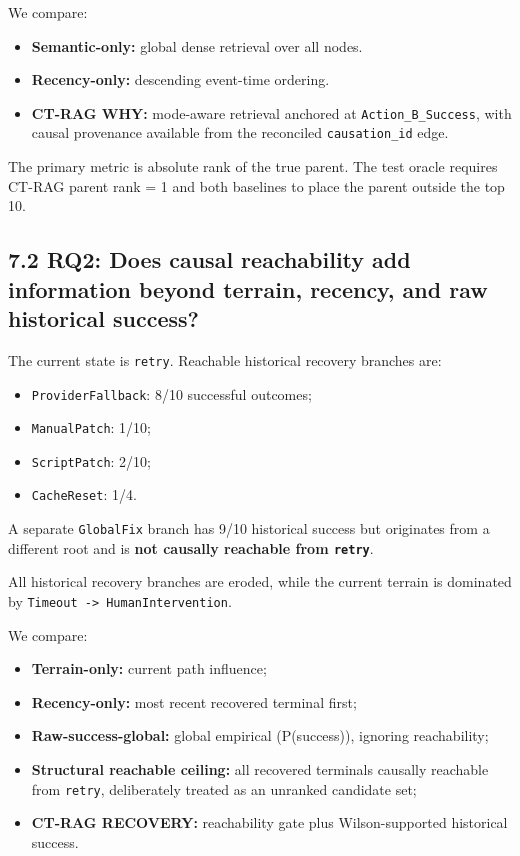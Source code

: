 \documentclass[
  11pt,
]{article}
\providecommand{\tightlist}{%
  \setlength{\itemsep}{0pt}\setlength{\parskip}{0pt}}
\begin{document}
We compare:

\begin{itemize}
\tightlist
\item
  \textbf{Semantic-only:} global dense retrieval over all nodes.
\item
  \textbf{Recency-only:} descending event-time ordering.
\item
  \textbf{CT-RAG WHY:} mode-aware retrieval anchored at
  \texttt{Action\_B\_Success}, with causal provenance available from the
  reconciled \texttt{causation\_id} edge.
\end{itemize}

The primary metric is absolute rank of the true parent. The test oracle
requires CT-RAG parent rank = 1 and both baselines to place the parent
outside the top 10.

\subsection{7.2 RQ2: Does causal reachability add information beyond
terrain, recency, and raw historical
success?}\label{rq2-does-causal-reachability-add-information-beyond-terrain-recency-and-raw-historical-success}

The current state is \texttt{retry}. Reachable historical recovery
branches are:

\begin{itemize}
\tightlist
\item
  \texttt{ProviderFallback}: 8/10 successful outcomes;
\item
  \texttt{ManualPatch}: 1/10;
\item
  \texttt{ScriptPatch}: 2/10;
\item
  \texttt{CacheReset}: 1/4.
\end{itemize}

A separate \texttt{GlobalFix} branch has 9/10 historical success but
originates from a different root and is \textbf{not causally reachable
from \texttt{retry}}.

All historical recovery branches are eroded, while the current terrain
is dominated by \texttt{Timeout\ -\textgreater{}\ HumanIntervention}.

We compare:

\begin{itemize}
\tightlist
\item
  \textbf{Terrain-only:} current path influence;
\item
  \textbf{Recency-only:} most recent recovered terminal first;
\item
  \textbf{Raw-success-global:} global empirical (P(success)), ignoring
  reachability;
\item
  \textbf{Structural reachable ceiling:} all recovered terminals
  causally reachable from \texttt{retry}, deliberately treated as an
  unranked candidate set;
\item
  \textbf{CT-RAG RECOVERY:} reachability gate plus Wilson-supported
  historical success.
\end{itemize}
\end{document}
